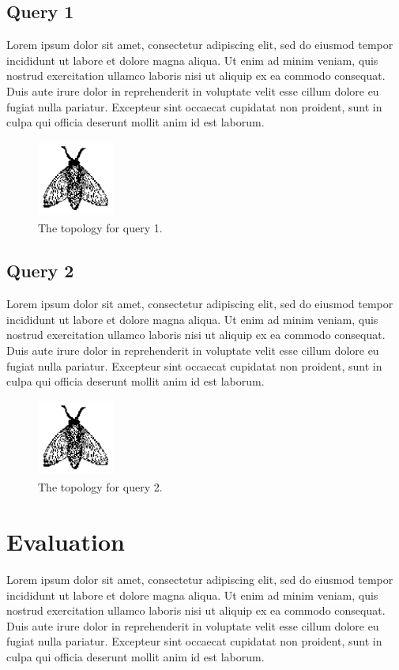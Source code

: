 \documentclass{sig-alternate-05-2015}
\begin{document}
\subsection{Query 1}
Lorem ipsum dolor sit amet, consectetur adipiscing elit, sed do eiusmod tempor incididunt ut labore et dolore magna aliqua. Ut enim ad minim veniam, quis nostrud exercitation ullamco laboris nisi ut aliquip ex ea commodo consequat. Duis aute irure dolor in reprehenderit in voluptate velit esse cillum dolore eu fugiat nulla pariatur. Excepteur sint occaecat cupidatat non proident, sunt in culpa qui officia deserunt mollit anim id est laborum.

\begin{figure}
	\centering
	\includegraphics[height=1in, width=1in]{figures/fly}
	\caption{The topology for query 1.}
\end{figure}

\subsection{Query 2}
Lorem ipsum dolor sit amet, consectetur adipiscing elit, sed do eiusmod tempor incididunt ut labore et dolore magna aliqua. Ut enim ad minim veniam, quis nostrud exercitation ullamco laboris nisi ut aliquip ex ea commodo consequat. Duis aute irure dolor in reprehenderit in voluptate velit esse cillum dolore eu fugiat nulla pariatur. Excepteur sint occaecat cupidatat non proident, sunt in culpa qui officia deserunt mollit anim id est laborum.

\begin{figure}
	\centering
	\includegraphics[height=1in, width=1in]{figures/fly}
	\caption{The topology for query 2.}
\end{figure}

\section{Evaluation}
Lorem ipsum dolor sit amet, consectetur adipiscing elit, sed do eiusmod tempor incididunt ut labore et dolore magna aliqua. Ut enim ad minim veniam, quis nostrud exercitation ullamco laboris nisi ut aliquip ex ea commodo consequat. Duis aute irure dolor in reprehenderit in voluptate velit esse cillum dolore eu fugiat nulla pariatur. Excepteur sint occaecat cupidatat non proident, sunt in culpa qui officia deserunt mollit anim id est laborum.
\end{document}
